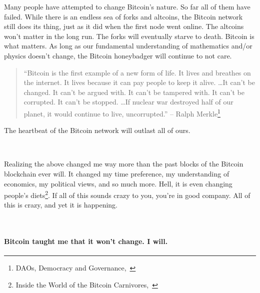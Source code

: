 Many people have attempted to change Bitcoin's nature. So far all of
them have failed. While there is an endless sea of forks and altcoins,
the Bitcoin network still does its thing, just as it did when the first
node went online. The altcoins won't matter in the long run. The forks
will eventually starve to death. Bitcoin is what matters. As long as our
fundamental understanding of mathematics and/or physics doesn't change,
the Bitcoin honeybadger will continue to not care.

\begin{samepage}\begin{quotation}
\enquote{Bitcoin is the first example of a new form of life. It lives and
breathes on the internet. It lives because it can pay people to keep
it alive. \ldots It can't be changed. It can't be argued with. It
can't be tampered with. It can't be corrupted. It can't be stopped.
\ldots If nuclear war destroyed half of our planet, it would continue
to live, uncorrupted.}
\flushright -- Ralph Merkle\footnote{DAOs, Democracy and
Governance,~\cite{merkle-dao}}
\end{quotation}\end{samepage}

The heartbeat of the Bitcoin network will outlast all of ours.

~

Realizing the above changed me way more than the past blocks of the Bitcoin
blockchain ever will. It changed my time preference, my understanding of
economics, my political views, and so much more. Hell, it is even changing
people's diets\footnote{Inside the World of the Bitcoin
Carnivores,~\cite{carnivores}}. If all of this sounds crazy to you, you're in
good company. All of this is crazy, and yet it is happening.

~

\paragraph{Bitcoin taught me that it won't change. I will.}

